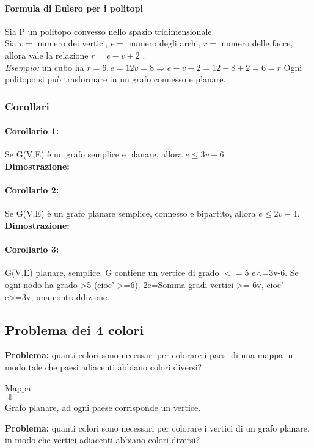 \paragraph{Formula di Eulero per i politopi}
Sia P un politopo convesso nello spazio tridimensionale. \\
Sia \(v =\) numero dei vertici,
\(e =\) numero degli archi,
\(r =\) numero delle facce,
allora vale la relazione \(r = e - v + 2\) . \\
\textit{Esempio:} un cubo ha \(r=6, e=12 v=8 \Rightarrow e- v+2=12-8+2=6=r\)
Ogni politopo si può trasformare in un grafo connesso e planare.

\subsubsection{Corollari}
\paragraph{Corollario 1:} Se G(V,E) è un grafo semplice e planare, allora \(e \leq 3v - 6\). \\
\textbf{Dimostrazione:}

\paragraph{Corollario 2:} Se G(V,E) è un grafo planare semplice, connesso e bipartito, allora \(e \leq 2v - 4\).\\
\textbf{Dimostrazione:}

\paragraph{Corollario 3:} G(V,E) planare, semplice, G contiene un vertice di grado \(<= 5\)
e<=3v-6.
Se ogni nodo ha grado >5 (cioe' >=6).
2e=Somma gradi vertici >= 6v, cioe' e>=3v, una contraddizione.

\subsection{Problema dei 4 colori}
\textbf{Problema:} quanti colori sono necessari per colorare i paesi di una
mappa in modo tale che paesi adiacenti abbiano colori diversi?
\begin{center}
Mappa \\
\(\Downarrow \) \\
Grafo planare, ad ogni paese corrisponde un vertice.
\end{center}
\textbf{Problema:} quanti colori sono necessari per colorare i vertici di un grafo
planare, in modo che vertici adiacenti abbiano colori diversi? \\

